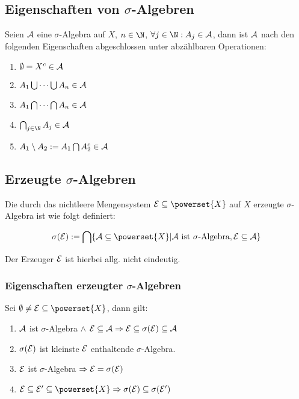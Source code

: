 \subsection*{Eigenschaften von $\sigma$-Algebren}

Seien $\mathcal{A}$ eine $\sigma$-Algebra auf $X$, $n \in \N$, $\forall j \in \N : A_j \in \A$, dann ist $\mathcal{A}$ nach den folgenden Eigenschaften abgeschlossen unter abzählbaren Operationen:

\begin{enumerate}[label=(\alph*)]
	\item $\emptyset = X^c \in \mathcal{A}$
	\item $A_1 \bigcup \cdots \bigcup A_n \in \mathcal{A}$
	\item $A_1 \bigcap \cdots \bigcap A_n \in \mathcal{A}$
	\item $\bigcap_{j\in \N} A_j \in \A$
	\item $A_1 \setminus A_2 := A_1 \bigcap A_2^c \in \mathcal{A}$
\end{enumerate}

\subsection*{Erzeugte $\sigma$-Algebren}

Die durch das nichtleere Mengensystem $\E \subseteq \powerset{X}$ auf $X$ erzeugte $\sigma$-Algebra ist wie folgt definiert:

\vspace*{-4mm}
\[ \sigma(\E) := \bigcap\{ \A \subseteq \powerset{X} | \A \text{ ist } \sigma \text{-Algebra}, \E \subseteq \A \} \]

Der Erzeuger $\mathcal{E}$ ist hierbei allg. nicht eindeutig.

\subsubsection*{Eigenschaften erzeugter $\sigma$-Algebren}

Sei $\emptyset \neq \E \subseteq \powerset{X}$, dann gilt:

\begin{enumerate}[label=(\alph*)]
	\item $\mathcal{A}$ ist $\sigma$-Algebra $\land$ $\mathcal{E} \subseteq \mathcal{A} \Rightarrow \mathcal{E} \subseteq \sigma(\mathcal{E}) \subseteq \mathcal{A}$
	\item $\sigma(\mathcal{E})$ ist kleinste $\mathcal{E}$ enthaltende $\sigma$-Algebra.
	\item $\mathcal{E}$ ist $\sigma$-Algebra $\Rightarrow \mathcal{E} = \sigma(\mathcal{E})$
	\item $\E \subseteq \E' \subseteq \powerset{X} \Rightarrow \sigma(\E) \subseteq \sigma(\E')$
\end{enumerate}

